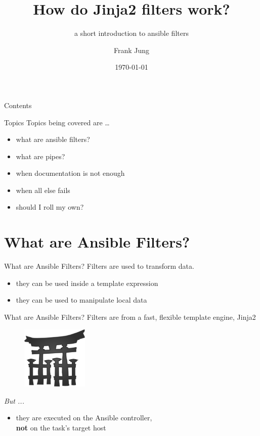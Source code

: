 \documentclass[pdf]{beamer}
\title{How do Jinja2 filters work?}
\subtitle{a short introduction to ansible filters}
\author{Frank Jung}
\institute{frankhjung@linux.com}
\date{\today}
\begin{document}
\begin{frame}
  \titlepage{}
\end{frame}

\begin{frame}{Contents}
  \tableofcontents{}
\end{frame}

\begin{frame}{Topics}
  Topics being covered are \ldots
  \pause{}
  \begin{itemize}
    \item{} what are ansible filters?
      \pause{}
    \item{} what are pipes?
      \pause{}
    \item{} when documentation is not enough
      \pause{}
    \item{} when all else fails
      \pause{}
    \item{} should I roll my own?
  \end{itemize}
\end{frame}

\section{What are Ansible Filters?}
\begin{frame}{What are Ansible Filters?}
  Filters are used to transform data.
  \pause{}
  \begin{itemize}
    \item{} they can be used inside a template expression
      \pause{}
    \item{} they can be used to manipulate local data
  \end{itemize}
\end{frame}

\begin{frame}{What are Ansible Filters?}
	Filters are from a fast, flexible template engine, Jinja2\\
	\begin{figure}[t]
		\includegraphics[height=3.0cm]{jinja-logo.png}
	\end{figure}
  \pause{}
	\textit{But ...}\\
  \begin{itemize}
		\item{} they are executed on the Ansible controller,\\
			\textbf{not} on the task's target host
      \pause{}
  \end{itemize}
\end{frame}
\end{document}
